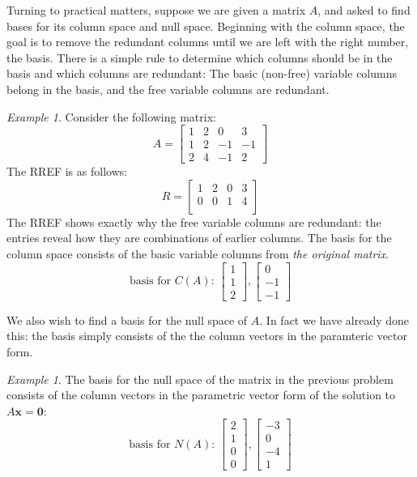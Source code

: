 \documentclass[11pt,oneside]{amsbook}
\theoremstyle{definition}
\theoremstyle{plain}
\theoremstyle{definition}
\theoremstyle{remark}
\newtheorem{example}[theorem]{Example}
\numberwithin{equation}{section}
\numberwithin{figure}{section}
\begin{document}
Turning to practical matters, suppose we are given a matrix $A$, and asked to find bases for its column space and null space. Beginning with the column space, the goal is to remove the redundant columns until we are left with the right number, the basis. There is a simple rule to determine which columns should be in the basis and which columns are redundant: The basic (non-free) variable columns belong in the basis, and the free variable columns are redundant.

\begin{example}
  Consider the following matrix:
  \[A=\begin{bmatrix}1&2&0&3\\1&2&-1&-1\\2&4&-1&2\end{bmatrix}
  \]
  The RREF is as follows:
  \[R=\begin{bmatrix}1&2&0&3\\0&0&1&4\\&&&\end{bmatrix}
  \]
  The RREF shows exactly why the free variable columns are redundant: the entries reveal how they are combinations of earlier columns. The basis for the column space consists of the basic variable columns from \emph{the original matrix}.
  \[\text{basis for $C(A)$: }\begin{bmatrix}1\\1\\2\end{bmatrix},
  \begin{bmatrix}0\\-1\\-1\end{bmatrix}
  \]
\end{example}

We also wish to find a basis for the null space of $A$. In fact we have already done this: the basis simply consists of the the column vectors in the paramteric vector form.

\begin{example}
  The basis for the null space of the matrix in the previous problem consists of the column vectors in the parametric vector form of the solution to $A\mathbf{x}=\mathbf{0}$:
  \[\text{basis for $N(A)$: }\begin{bmatrix}2\\1\\0\\0\end{bmatrix},
  \begin{bmatrix}-3\\0\\-4\\1\end{bmatrix}
  \]
\end{example}
\end{document}
